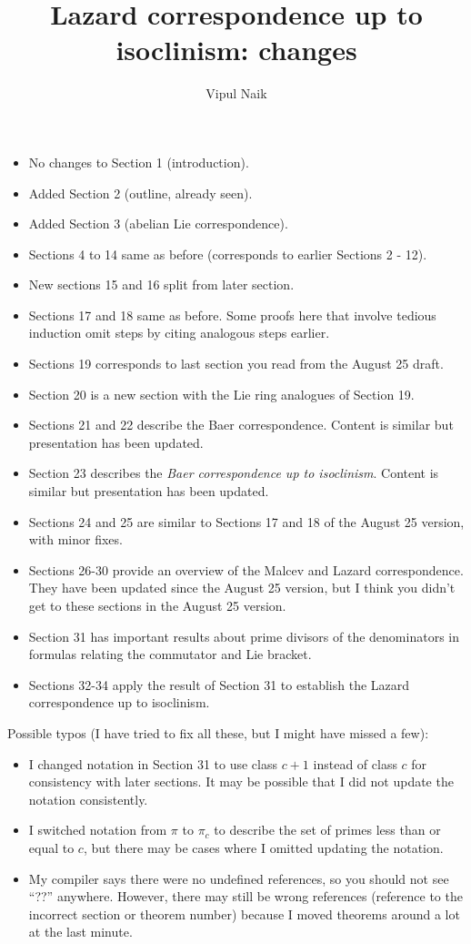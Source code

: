 \documentclass[10pt]{amsart}
\title{Lazard correspondence up to isoclinism: changes}
\author{Vipul Naik}
\begin{document}
\maketitle
\onehalfspacing

\begin{itemize}
\item No changes to Section 1 (introduction).
\item Added Section 2 (outline, already seen).
\item Added Section 3 (abelian Lie correspondence).
\item Sections 4 to 14 same as before (corresponds to earlier Sections
  2 - 12).
\item New sections 15 and 16 split from later section.
\item Sections 17 and 18 same as before. Some proofs here that involve
  tedious induction omit steps by citing analogous steps earlier.
\item Sections 19 corresponds to last section you read from the August
  25 draft.
\item Section 20 is a new section with the Lie ring analogues of
  Section 19.
\item Sections 21 and 22 describe the Baer correspondence. Content is
  similar but presentation has been updated.
\item Section 23 describes the {\em Baer correspondence up to
  isoclinism}. Content is similar but presentation has been updated.
\item Sections 24 and 25 are similar to Sections 17 and 18 of the
  August 25 version, with minor fixes.
\item Sections 26-30 provide an overview of the Malcev and Lazard
  correspondence. They have been updated since the August 25 version,
  but I think you didn't get to these sections in the August 25
  version.
\item Section 31 has important results about prime divisors of the
  denominators in formulas relating the commutator and Lie bracket.
\item Sections 32-34 apply the result of Section 31 to establish the
  Lazard correspondence up to isoclinism.
\end{itemize}

Possible typos (I have tried to fix all these, but I might have missed
a few):

\begin{itemize}
\item I changed notation in Section 31 to use class $c + 1$ instead of
  class $c$ for consistency with later sections. It may be possible
  that I did not update the notation consistently.
\item I switched notation from $\pi$ to $\pi_c$ to describe the set of
  primes less than or equal to $c$, but there may be cases where I
  omitted updating the notation.
\item My compiler says there were no undefined references, so you
  should not see ``??'' anywhere. However, there may still be wrong
  references (reference to the incorrect section or theorem number)
  because I moved theorems around a lot at the last minute.
\end{itemize}
\end{document}
